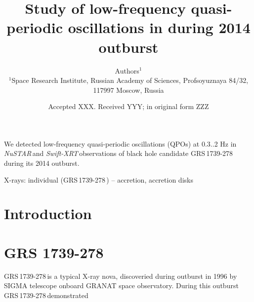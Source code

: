 \documentclass[a4paper,fleqn,usenatbib]{mnras}
\title[Study of low-frequency QPO in \grs]{Study of low-frequency quasi-periodic oscillations in \grs during 2014 outburst}
\author[Authors]{
Authors$^{1}$
\\
$^{1}$Space Research Institute, Russian Academy of Sciences, Profsoyuznaya 84/32, 117997 Moscow, Russia\\
}
\date{Accepted XXX. Received YYY; in original form ZZZ}
\def\grs{{GRS\,1739-278\,}}
\def\swiftx{{\em Swift-XRT\,}}
\def\nustar{{\em NuSTAR\,}}
\begin{document}
\label{firstpage}
\pagerange{\pageref{firstpage}--\pageref{lastpage}}
\maketitle

\begin{abstract}
\end{abstract}
We detected low-frequency quasi-periodic oscillations (QPOs) at 0.3..2 Hz in \nustar and \swiftx observations of black hole candidate \grs during its 2014 outburst.

\begin{keywords}
X-rays: individual (\grs)  -- accretion, accretion disks	
\end{keywords}


\section{Introduction}
\label{sec:intro} 


\section{GRS 1739-278}

\grs is a typical X-ray nova, discoveried during outburst in 1996  \citep{paul96} by SIGMA \citep{paul91} telescope onboard GRANAT space observatory. During this outburst \grs demonstrated

\end{document}
